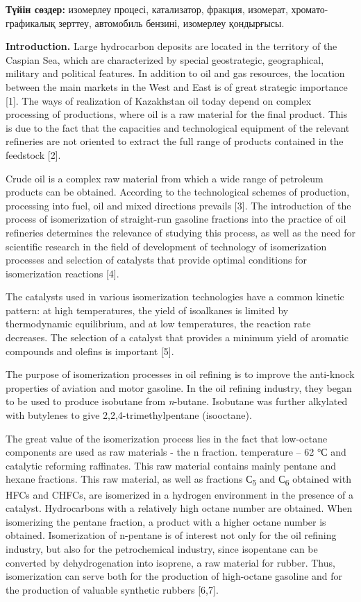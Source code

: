 {\bfseries Түйін сөздер:} изомерлеу процесі, катализатор, фракция,
изомерат, хромато-графикалық зерттеу, автомобиль бензині, изомерлеу
қондырғысы.

\begin{multicols}{2}
{\bfseries Introduction.} Large hydrocarbon deposits are located in the
territory of the Caspian Sea, which are characterized by special
geostrategic, geographical, military and political features. In addition
to oil and gas resources, the location between the main markets in the
West and East is of great strategic importance {[}1{]}. The ways of
realization of Kazakhstan oil today depend on complex processing of
productions, where oil is a raw material for the final product. This is
due to the fact that the capacities and technological equipment of the
relevant refineries are not oriented to extract the full range of
products contained in the feedstock {[}2{]}.

Crude oil is a complex raw material from which a wide range of petroleum
products can be obtained. According to the technological schemes of
production, processing into fuel, oil and mixed directions prevails
{[}3{]}. The introduction of the process of isomerization of
straight-run gasoline fractions into the practice of oil refineries
determines the relevance of studying this process, as well as the need
for scientific research in the field of development of technology of
isomerization processes and selection of catalysts that provide optimal
conditions for isomerization reactions {[}4{]}.

The catalysts used in various isomerization technologies have a common
kinetic pattern: at high temperatures, the yield of isoalkanes is
limited by thermodynamic equilibrium, and at low temperatures, the
reaction rate decreases. The selection of a catalyst that provides a
minimum yield of aromatic compounds and olefins is important {[}5{]}.

The purpose of isomerization processes in oil refining is to improve the
anti-knock properties of aviation and motor gasoline. In the oil
refining industry, they began to be used to produce isobutane from
\emph{n}-butane. Isobutane was further alkylated with butylenes to give
2,2,4-trimethylpentane (isooctane).

The great value of the isomerization process lies in the fact that
low-octane components are used as raw materials - the n fraction.
temperature -- 62 °С and catalytic reforming raffinates. This raw
material contains mainly pentane and hexane fractions. This raw
material, as well as fractions С\textsubscript{5} and С\textsubscript{6}
obtained with HFCs and CHFCs, are isomerized in a hydrogen environment
in the presence of a catalyst. Hydrocarbons with a relatively high
octane number are obtained. When isomerizing the pentane fraction, a
product with a higher octane number is obtained. Isomerization of
n-pentane is of interest not only for the oil refining industry, but
also for the petrochemical industry, since isopentane can be converted
by dehydrogenation into isoprene, a raw material for rubber. Thus,
isomerization can serve both for the production of high-octane gasoline
and for the production of valuable synthetic rubbers {[}6,7{]}.


\end{multicols}
